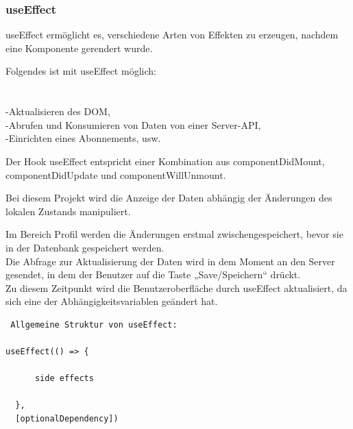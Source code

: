 \newpage

\subsubsection{useEffect}
useEffect ermöglicht es, verschiedene Arten von Effekten zu erzeugen, nachdem eine Komponente gerendert wurde.

Folgendes ist mit useEffect möglich:\\\\
\\-Aktualisieren des DOM,
\\-Abrufen und Konsumieren von Daten von einer Server-API,
\\-Einrichten eines Abonnements, usw.
\\
\begin{flushleft}
  Der Hook useEffect entspricht einer Kombination aus componentDidMount, componentDidUpdate und componentWillUnmount.

  Bei diesem Projekt wird die Anzeige der Daten abhängig der Änderungen des lokalen Zustands manipuliert.
\end{flushleft}

Im Bereich Profil werden die Änderungen erstmal zwischengespeichert, bevor sie in der Datenbank gespeichert werden. 
\\
Die Abfrage zur Aktualisierung der Daten wird in dem Moment an den Server gesendet, in dem der Benutzer auf die Taste „Save/Speichern“ drückt.
\\
Zu diesem Zeitpunkt wird die Benutzeroberfläche durch useEffect aktualisiert, da sich eine der Abhängigkeitsvariablen geändert hat.
\\
\begin{lstlisting}
 Allgemeine Struktur von useEffect:

useEffect(() => { 
      
      side effects

  }, 
  [optionalDependency])           
\end{lstlisting}

